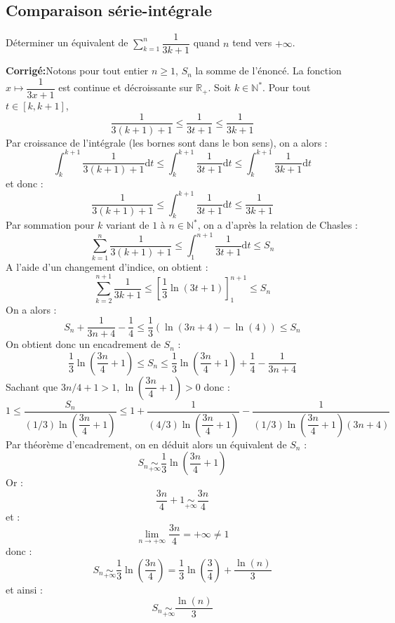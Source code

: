 \documentclass[a4paper,twoside,french,10pt]{VcCours}
\newcommand{\corr}{\textbf{Corrigé:}}
\newcommand{\dt}{\text{d}t}
\newcommand{\Sum}[2]{\ensuremath{\textstyle{\sum\limits_{#1}^{#2}}}}
\begin{document}
\medskip

\subsection{Comparaison série-intégrale}

\medskip

\begin{Exercice}{} Déterminer un équivalent de $\Sum{k=1}n \dfrac{1}{3k+1}$ quand $n$ tend vers $+ \infty$.
\end{Exercice}

\corr Notons pour tout entier $n \geq 1$, $S_n$ la somme de l'énoncé. La fonction $x \mapsto \dfrac{1}{3x+1}$ est continue et décroissante sur $\mathbb{R}_+$. Soit $k \in \mathbb{N}^*$. Pour tout $t \in [k,k+1]$,
$$ \dfrac{1}{3(k+1)+1} \leq \dfrac{1}{3t+1} \leq \dfrac{1}{3k+1}$$
Par croissance de l'intégrale (les bornes sont dans le bon sens), on a alors :
$$ \int_{k}^{k+1} \dfrac{1}{3(k+1)+1} \dt \leq  \int_{k}^{k+1} \dfrac{1}{3t+1} \dt \leq  \int_{k}^{k+1} \dfrac{1}{3k+1} \dt$$
et donc :
$$  \dfrac{1}{3(k+1)+1}  \leq  \int_{k}^{k+1} \dfrac{1}{3t+1} \dt  \leq  \dfrac{1}{3k+1} $$
Par sommation pour $k$ variant de $1$ à $n \in \mathbb{N}^*$, on a d'après la relation de Chasles :
$$ \sum_{k=1}^n \dfrac{1}{3(k+1)+1}  \leq  \int_{1}^{n+1} \dfrac{1}{3t+1} \dt  \leq S_n $$
A l'aide d'un changement d'indice, on obtient :
$$ \sum_{k=2}^{n+1} \dfrac{1}{3k+1}  \leq  \left[ \dfrac{1}{3} \ln(3t+1) \right]_1^{n+1}  \leq S_n $$
On a alors :
$$ S_n + \dfrac{1}{3n+4} - \dfrac{1}{4} \leq \dfrac{1}{3} ( \ln(3n+4)- \ln(4)) \leq S_n $$
On obtient donc un encadrement de $S_n$ :
$$ \dfrac{1}{3} \ln \left( \dfrac{3n}{4} + 1 \right) \leq S_n \leq \dfrac{1}{3} \ln \left( \dfrac{3n}{4} + 1 \right) + \dfrac{1}{4} - \dfrac{1}{3n+4}$$
Sachant que $3n/4+1>1$, $\ln \left( \dfrac{3n}{4} + 1 \right)>0$ donc :
$$ 1 \leq \dfrac{S_n}{(1/3)\ln \left( \dfrac{3n}{4} + 1 \right)} \leq 1 + \dfrac{1}{(4/3)\ln \left( \dfrac{3n}{4} + 1 \right)} - \dfrac{1}{(1/3)\ln \left( \dfrac{3n}{4} + 1 \right)(3n+4)}$$
Par théorème d'encadrement, on en déduit alors un équivalent de $S_n$ :
$$ S_n \underset{+ \infty}{\sim}\dfrac{1}{3} \ln \left( \dfrac{3n}{4} + 1 \right)$$
Or :
$$  \dfrac{3n}{4} + 1 \underset{+ \infty}{\sim}  \dfrac{3n}{4}$$
et :
$$ \lim_{n \rightarrow + \infty}  \dfrac{3n}{4} = + \infty \neq 1$$
donc :
$$ S_n \underset{+ \infty}{\sim} \dfrac{1}{3} \ln \left( \dfrac{3n}{4} \right) =  \dfrac{1}{3} \ln \left( \dfrac{3}{4} \right) + \dfrac{\ln(n)}{3}$$
et ainsi :
$$ S_n \underset{+ \infty}{\sim}\dfrac{\ln(n)}{3}$$
\end{document}
